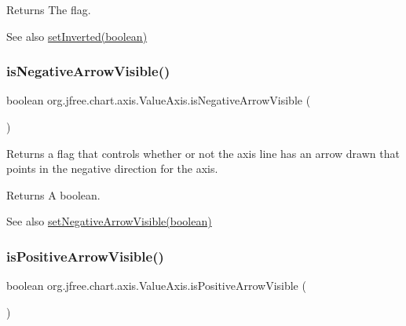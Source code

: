 \begin{DoxyReturn}{Returns}
The flag.
\end{DoxyReturn}
\begin{DoxySeeAlso}{See also}
\mbox{\hyperlink{classorg_1_1jfree_1_1chart_1_1axis_1_1_value_axis_af1d2e514f72c75bab68872d87ad9ee50}{set\+Inverted(boolean)}} 
\end{DoxySeeAlso}
\mbox{\label{classorg_1_1jfree_1_1chart_1_1axis_1_1_value_axis_acddcfabc4466e9bfb3280d40183bdaa5}} 
\subsubsection{\texorpdfstring{is\+Negative\+Arrow\+Visible()}{isNegativeArrowVisible()}}
{\footnotesize\ttfamily boolean org.\+jfree.\+chart.\+axis.\+Value\+Axis.\+is\+Negative\+Arrow\+Visible (\begin{DoxyParamCaption}{ }\end{DoxyParamCaption})}

Returns a flag that controls whether or not the axis line has an arrow drawn that points in the negative direction for the axis.

\begin{DoxyReturn}{Returns}
A boolean.
\end{DoxyReturn}
\begin{DoxySeeAlso}{See also}
\mbox{\hyperlink{classorg_1_1jfree_1_1chart_1_1axis_1_1_value_axis_a893d80e7d1feb0c3e083749a11bebc5f}{set\+Negative\+Arrow\+Visible(boolean)}} 
\end{DoxySeeAlso}
\mbox{\label{classorg_1_1jfree_1_1chart_1_1axis_1_1_value_axis_a22d3f1b5a1ecb24e760a2eb9fc49c615}} 
\subsubsection{\texorpdfstring{is\+Positive\+Arrow\+Visible()}{isPositiveArrowVisible()}}
{\footnotesize\ttfamily boolean org.\+jfree.\+chart.\+axis.\+Value\+Axis.\+is\+Positive\+Arrow\+Visible (\begin{DoxyParamCaption}{ }\end{DoxyParamCaption})}

